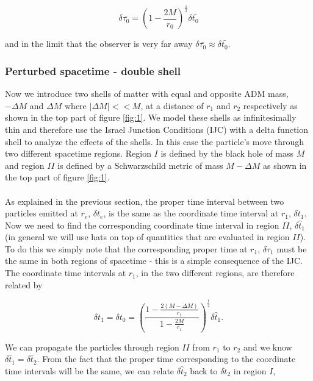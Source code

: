 \documentclass[aps,showpacs,onecolumn,floats,prd,superscriptaddress,nofootinbib]{revtex4}
\begin{document}
\begin{equation}
	\delta \bar{\tau_0} = \left( 1 -\frac{2M}{r_0} \right)^\frac{1}{2} \delta \bar{t_0}
\end{equation}

and in the limit that the observer is very far away $\delta \bar{\tau_0} \approx \delta \bar{t_0}$. 

\subsubsection{Perturbed spacetime - double shell}

Now we introduce two shells of matter with equal and opposite ADM mass, $-\Delta M$ and $\Delta M$ where $|\Delta M|<<M$, at a distance of $r_1$ and $r_2$ respectively as shown in the top part of figure \ref{fig:1}. We model these shells as infinitesimally thin and therefore use the Israel Junction Conditions (IJC) \cite{Isr66} with a delta function shell to analyze the effects of the shells. In this case the particle's move through two different spacetime regions. Region $I$ is defined by the black hole of mass $M$ and region $II$ is defined by a Schwarzschild metric of mass $M-\Delta M$ as shown in the top part of figure \ref{fig:1}.
\\
\\
As explained in the previous section, the proper time interval between two particles emitted at $r_e$, $\delta t_e$, is the same as the coordinate time interval at $r_1$, $\delta t_1$. Now we need to find the corresponding coordinate time interval in region $II$, $\delta \hat{t}_1$ (in general we will use hats on top of quantities that are evaluated in region $II$). To do this we simply note that the corresponding proper time at $r_1$, $\delta \tau_1$ must be the same in both regions of spacetime - this is a simple consequence of the IJC. The coordinate time intervals at $r_1$, in the two different regions, are therefore related by

\begin{equation}
	\delta t_1 = \delta t_0 = \left( \frac{1 - \frac{2(M - \Delta M)}{r_1}}{1 - \frac{2M}{r_1}} \right)^\frac{1}{2} \delta \hat{t}_1.
\end{equation}

We can propagate the particles through region $II$ from $r_1$ to $r_2$ and we know $\delta \hat{t}_1 = \delta \hat{t}_2$. From the fact that the proper time corresponding to the coordinate time intervals will be the same, we can relate $\delta \hat{t}_2$ back to $\delta t_2$ in region $I$, 
\end{document}
